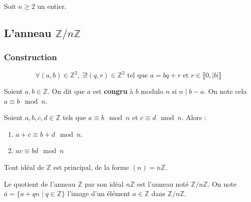 




  Soit $n \geq 2$ un entier.

  \subsection{L'anneau \texorpdfstring{$\mathbb{Z}/n\mathbb{Z}$}{Z/nZ}}

  \subsubsection{Construction}


  \begin{theorem}
    \[ \forall (a, b) \in \mathbb{Z}^2, \, \exists! (q, r) \in \mathbb{Z}^2 \text{ tel que } a=bq+r \text{ et } r \in \llbracket 0, \vert b \vert \rrbracket \]
  \end{theorem}


  \begin{definition}
    Soient $a, b \in \mathbb{Z}$. On dit que $a$ est \textbf{congru} à $b$ modulo $n$ si $n \mid b-a$. On note cela $a \equiv b \mod n$.
  \end{definition}

  \begin{proposition}
    \label{120-1}
    Soient $a, b, c, d \in \mathbb{Z}$ tels que $a \equiv b \mod n$ et $c \equiv d \mod n$. Alors :
    \begin{enumerate}[label={\bfseries(\roman*)}]
      \item $a+c \equiv b+d \mod n$.
      \item $ac \equiv bd \mod n$
    \end{enumerate}
  \end{proposition}

  \begin{lemma}
    Tout idéal de $\mathbb{Z}$ est principal, de la forme $(n) = n\mathbb{Z}$.
  \end{lemma}

  \begin{definition}
    Le quotient de l'anneau $\mathbb{Z}$ par son idéal $n\mathbb{Z}$ est l'anneau noté $\mathbb{Z}/n\mathbb{Z}$. On note $\overline{a} = \{ a + qn \mid q \in \mathbb{Z} \}$ l'image d'un élément $a \in \mathbb{Z}$ dans $\mathbb{Z}/n\mathbb{Z}$.
  \end{definition}

